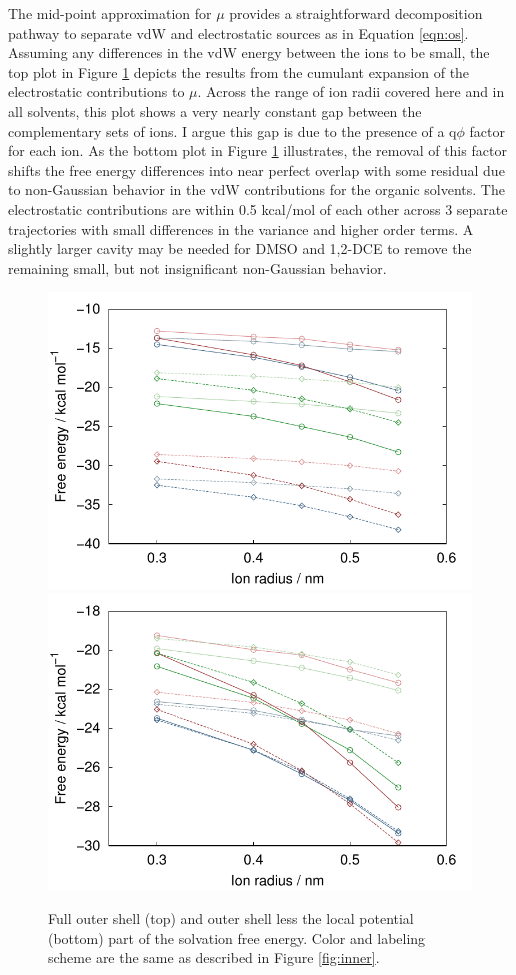 \begin{tatb}
  The mid-point approximation for $\mu$ provides a straightforward decomposition pathway to separate vdW and electrostatic sources as in Equation 
  \ref{eqn:os}. Assuming any differences in the vdW energy between the ions to be small, the top plot in Figure \ref{fig:outer} depicts the results from the cumulant
  expansion of the electrostatic contributions to $\mu$. Across the range of ion radii covered here and in all solvents, this plot shows a very nearly
  constant gap between the complementary sets of ions. I argue this gap is due to the presence of a q$\phi$ factor for each ion. As the bottom plot in 
  Figure \ref{fig:outer} illustrates, the removal of this factor shifts the free energy differences into near perfect overlap with some residual due to non-Gaussian
  behavior in the vdW contributions for the organic solvents. The electrostatic contributions are within 0.5 kcal/mol of each other across 3 separate trajectories
  with small differences in the variance and higher order terms. A slightly larger cavity may be needed for DMSO and 1,2-DCE to remove the remaining small, but not 
  insignificant non-Gaussian behavior.

\begin{figure}
 \begin{center}
  \includegraphics[width=0.80\linewidth]{images/tatb/os.pdf}
  \includegraphics[width=0.80\linewidth]{images/tatb/os_m_qlp.pdf}
  \caption[Outer shell portion of the solvation free energy]{\label{fig:outer}Full outer shell (top) and outer shell less the local potential (bottom) part of the
  solvation free energy. Color and labeling scheme are the same as described in Figure \ref{fig:inner}.}
 \end{center}
\end{figure}


\end{tatb}
